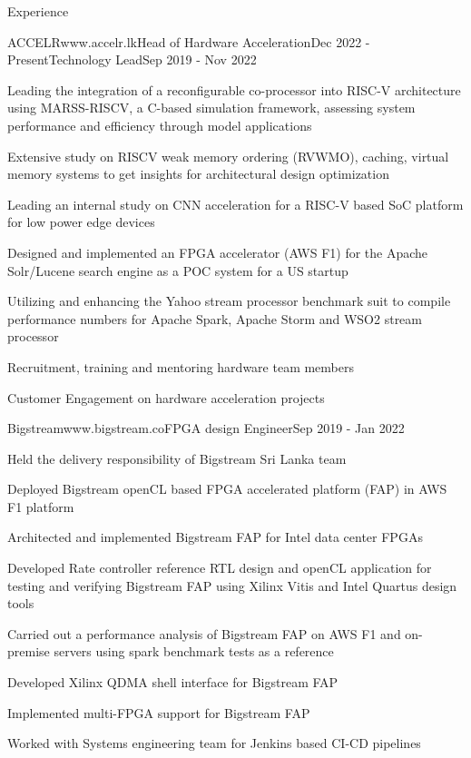 \documentclass[
11pt, %
]{./../assets/resume} %
\begin{document}
\begin{rSection}{Experience}
	\begin{rSubsectionM}{ACCELR}{www.accelr.lk}{Head of Hardware Acceleration}{Dec 2022 - Present}{Technology Lead}{Sep 2019 - Nov 2022}{}{}
		\item Leading the integration of a reconfigurable co-processor into RISC-V architecture using MARSS-RISCV, a C-based simulation framework, assessing system performance and efficiency through model applications
		\item Extensive study on RISCV weak memory ordering (RVWMO), caching, virtual memory systems to get insights for architectural design optimization
		\item Leading an internal study on CNN acceleration for a RISC-V based SoC platform for low power edge devices
		\item Designed and implemented an FPGA accelerator (AWS F1) for the Apache Solr/Lucene search engine as a POC system for a US startup
		\item Utilizing and enhancing the Yahoo stream processor benchmark suit to compile performance numbers for  Apache Spark, Apache Storm and WSO2 stream processor
		\item Recruitment, training and mentoring hardware team members
		\item Customer Engagement on hardware acceleration projects
	\end{rSubsectionM}
	\begin{rSubsectionX}{Bigstream}{www.bigstream.co}{FPGA design Engineer}{Sep 2019 - Jan 2022}
		\item Held the delivery responsibility of Bigstream Sri Lanka team
		\item Deployed Bigstream openCL based FPGA accelerated platform (FAP) in AWS F1 platform
		\item Architected and implemented Bigstream FAP for Intel data center FPGAs
		\item Developed Rate controller reference RTL design and openCL application for testing and verifying Bigstream FAP using Xilinx Vitis and Intel Quartus design tools
		\item Carried out a performance analysis of Bigstream FAP on AWS F1 and on-premise servers using spark benchmark tests as a reference
		\item Developed Xilinx QDMA shell interface for Bigstream FAP
		\item Implemented multi-FPGA support for Bigstream FAP
		\item Worked with Systems engineering team for Jenkins based CI-CD pipelines

\end{rSubsectionX}
\end{rSection}
\end{document}
